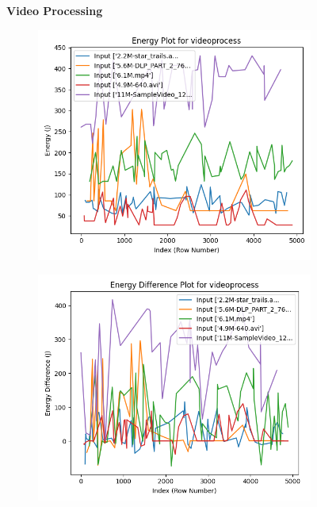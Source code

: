 \documentclass[times, 10pt,twocolumn]{article}
\begin{document}
\begin{figure}[ht]
   \textbf{Video Processing}\par\medskip
   \begin{subfigure}[b]{0.3\textwidth}
      \includegraphics[width=\textwidth]{imgs/final_experiment_plots/model_analysis/measurement_data_analysis/video_energy.png}
     \caption{}
     \label{fig:video_energy}
   \end{subfigure}
   \hfill
   \begin{subfigure}[b]{0.3\textwidth}
      \includegraphics[width=\textwidth]{imgs/final_experiment_plots/model_analysis/measurement_data_analysis/video_energy_diff.png}

\end{subfigure}
\end{figure}
\end{document}
